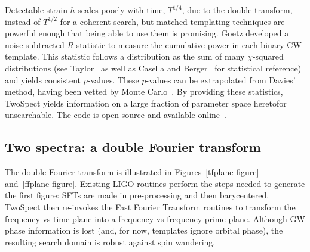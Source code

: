 Detectable strain $h$ scales poorly with time, $T^{1/4}$, due to the double transform, instead of $T^{1/2}$ for a coherent search, but matched templating techniques are powerful enough that being able to use them is promising.
Goetz developed a noise-subtracted $R$-statistic to measure the cumulative power in each binary CW template.
This statistic follows a distribution as the sum of many $\chi$-squared distributions (see Taylor~\cite{taylor} as well as Casella and Berger~\cite{CasellaBerger2001} for statistical reference) and yields consistent $p$-values.
These $p$-values can be extrapolated from Davies' method, having been vetted by Monte Carlo~\cite{GoetzTwoSpectMethods2011}.
By providing these statistics, TwoSpect yields information on a large fraction of parameter space heretofor unsearchable.
The code is open source and available online~\cite{LALAPPSrepo}.



            \subsection{Two spectra: a double Fourier transform}
            \label{two_spectra}


The double-Fourier transform is illustrated in Figures~\ref{tfplane-figure} and~\ref{ffplane-figure}.
Existing LIGO routines perform the steps needed to generate the first figure: SFTs are made in pre-processing and then barycentered.
TwoSpect then re-invokes the Fast Fourier Transform routines to transform the frequency vs time plane into a frequency vs frequency-prime plane.
Although GW phase information is lost (and, for now, templates ignore orbital phase), the resulting search domain is robust against spin wandering.

